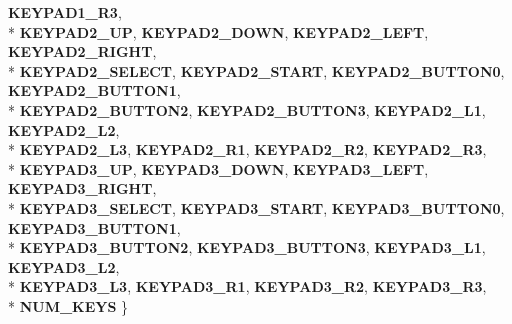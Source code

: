 \begin{DoxyCompactItemize}
{\bfseries K\+E\+Y\+P\+A\+D1\+\_\+\+R3}, 
\\*
{\bfseries K\+E\+Y\+P\+A\+D2\+\_\+\+UP}, 
{\bfseries K\+E\+Y\+P\+A\+D2\+\_\+\+D\+O\+WN}, 
{\bfseries K\+E\+Y\+P\+A\+D2\+\_\+\+L\+E\+FT}, 
{\bfseries K\+E\+Y\+P\+A\+D2\+\_\+\+R\+I\+G\+HT}, 
\\*
{\bfseries K\+E\+Y\+P\+A\+D2\+\_\+\+S\+E\+L\+E\+CT}, 
{\bfseries K\+E\+Y\+P\+A\+D2\+\_\+\+S\+T\+A\+RT}, 
{\bfseries K\+E\+Y\+P\+A\+D2\+\_\+\+B\+U\+T\+T\+O\+N0}, 
{\bfseries K\+E\+Y\+P\+A\+D2\+\_\+\+B\+U\+T\+T\+O\+N1}, 
\\*
{\bfseries K\+E\+Y\+P\+A\+D2\+\_\+\+B\+U\+T\+T\+O\+N2}, 
{\bfseries K\+E\+Y\+P\+A\+D2\+\_\+\+B\+U\+T\+T\+O\+N3}, 
{\bfseries K\+E\+Y\+P\+A\+D2\+\_\+\+L1}, 
{\bfseries K\+E\+Y\+P\+A\+D2\+\_\+\+L2}, 
\\*
{\bfseries K\+E\+Y\+P\+A\+D2\+\_\+\+L3}, 
{\bfseries K\+E\+Y\+P\+A\+D2\+\_\+\+R1}, 
{\bfseries K\+E\+Y\+P\+A\+D2\+\_\+\+R2}, 
{\bfseries K\+E\+Y\+P\+A\+D2\+\_\+\+R3}, 
\\*
{\bfseries K\+E\+Y\+P\+A\+D3\+\_\+\+UP}, 
{\bfseries K\+E\+Y\+P\+A\+D3\+\_\+\+D\+O\+WN}, 
{\bfseries K\+E\+Y\+P\+A\+D3\+\_\+\+L\+E\+FT}, 
{\bfseries K\+E\+Y\+P\+A\+D3\+\_\+\+R\+I\+G\+HT}, 
\\*
{\bfseries K\+E\+Y\+P\+A\+D3\+\_\+\+S\+E\+L\+E\+CT}, 
{\bfseries K\+E\+Y\+P\+A\+D3\+\_\+\+S\+T\+A\+RT}, 
{\bfseries K\+E\+Y\+P\+A\+D3\+\_\+\+B\+U\+T\+T\+O\+N0}, 
{\bfseries K\+E\+Y\+P\+A\+D3\+\_\+\+B\+U\+T\+T\+O\+N1}, 
\\*
{\bfseries K\+E\+Y\+P\+A\+D3\+\_\+\+B\+U\+T\+T\+O\+N2}, 
{\bfseries K\+E\+Y\+P\+A\+D3\+\_\+\+B\+U\+T\+T\+O\+N3}, 
{\bfseries K\+E\+Y\+P\+A\+D3\+\_\+\+L1}, 
{\bfseries K\+E\+Y\+P\+A\+D3\+\_\+\+L2}, 
\\*
{\bfseries K\+E\+Y\+P\+A\+D3\+\_\+\+L3}, 
{\bfseries K\+E\+Y\+P\+A\+D3\+\_\+\+R1}, 
{\bfseries K\+E\+Y\+P\+A\+D3\+\_\+\+R2}, 
{\bfseries K\+E\+Y\+P\+A\+D3\+\_\+\+R3}, 
\\*
{\bfseries N\+U\+M\+\_\+\+K\+E\+YS}
 \}\hypertarget{class_magnum_1_1_input_a234489c0b3354fcf811da5a637abdd00}{}\label{class_magnum_1_1_input_a234489c0b3354fcf811da5a637abdd00}

\end{DoxyCompactItemize}
